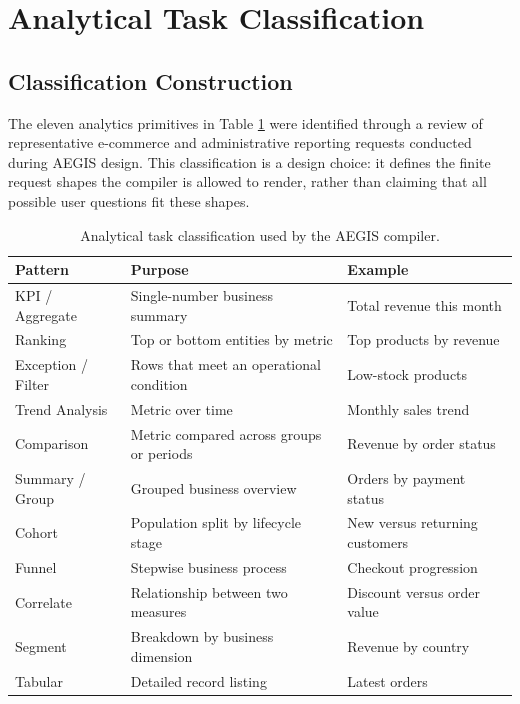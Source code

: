 \documentclass[pdflatex,sn-mathphys-num]{sn-jnl}
\begin{document}
\section{Analytical Task Classification}

\subsection{Classification Construction}

The eleven analytics primitives in Table \ref{tab:2} were identified through a review of representative e-commerce and administrative reporting requests conducted during AEGIS design. This classification is a design choice: it defines the finite request shapes the compiler is allowed to render, rather than claiming that all possible user questions fit these shapes.


\begin{table}[t]
\caption{Analytical task classification used by the AEGIS compiler.}
\label{tab:2}
\centering
\renewcommand{\arraystretch}{1.15}
\begin{tabular}{lp{}p{}}
\toprule
Pattern & Purpose & Example \\
\midrule
KPI / Aggregate & Single-number business summary & Total revenue this month \\
Ranking & Top or bottom entities by metric & Top products by revenue \\
Exception / Filter & Rows that meet an operational condition & Low-stock products \\
Trend Analysis & Metric over time & Monthly sales trend \\
Comparison & Metric compared across groups or periods & Revenue by order status \\
Summary / Group & Grouped business overview & Orders by payment status \\
Cohort & Population split by lifecycle stage & New versus returning customers \\
Funnel & Stepwise business process & Checkout progression \\
Correlate & Relationship between two measures & Discount versus order value \\
Segment & Breakdown by business dimension & Revenue by country \\
Tabular & Detailed record listing & Latest orders \\
\bottomrule
\end{tabular}
\end{table}
\end{document}

